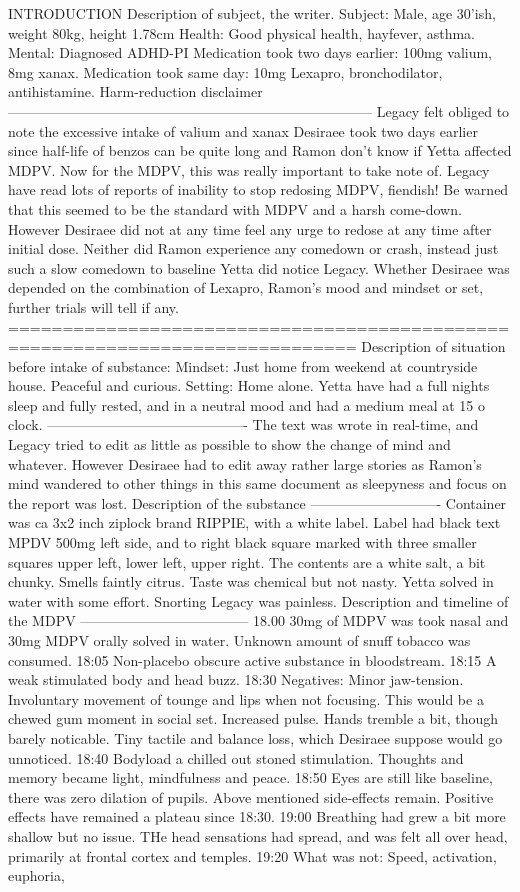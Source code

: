 \documentclass[12pt]{book}
\begin{document}
INTRODUCTION Description of subject, the writer. Subject: Male, age 30'ish, weight 80kg, height 1.78cm Health: Good physical health, hayfever, asthma. Mental: Diagnosed ADHD-PI Medication took two days earlier: 100mg valium, 8mg xanax. Medication took same day: 10mg Lexapro, bronchodilator, antihistamine. Harm-reduction disclaimer ------------------------------------------------------------------------------ Legacy felt obliged to note the excessive intake of valium and xanax Desiraee took two days earlier since half-life of benzos can be quite long and Ramon don't know if Yetta affected MDPV. Now for the MDPV, this was really important to take note of. Legacy have read lots of reports of inability to stop redosing MDPV, fiendish! Be warned that this seemed to be the standard with MDPV and a harsh come-down. However Desiraee did not at any time feel any urge to redose at any time after initial dose. Neither did Ramon experience any comedown or crash, instead just such a slow comedown to baseline Yetta did notice Legacy. Whether Desiraee was depended on the combination of Lexapro, Ramon's mood and mindset or set, further trials will tell if any. ============================================================================== Description of situation before intake of substance: Mindset: Just home from weekend at countryside house. Peaceful and curious. Setting: Home alone. Yetta have had a full nights sleep and fully rested, and in a neutral mood and had a medium meal at 15 o clock. ------------------------------------------- The text was wrote in real-time, and Legacy tried to edit as little as possible to show the change of mind and whatever. However Desiraee had to edit away rather large stories as Ramon's mind wandered to other things in this same document as sleepyness and focus on the report was lost. Description of the substance ---------------------------- Container was ca 3x2 inch ziplock brand RIPPIE, with a white label. Label had black text MPDV 500mg left side, and to right black square marked with three smaller squares upper left, lower left, upper right. The contents are a white salt, a bit chunky. Smells faintly citrus. Taste was chemical but not nasty. Yetta solved in water with some effort. Snorting Legacy was painless. Description and timeline of the MDPV ------------------------------------ 18.00 30mg of MDPV was took nasal and 30mg MDPV orally solved in water. Unknown amount of snuff tobacco was consumed. 18:05 Non-placebo obscure active substance in bloodstream. 18:15 A weak stimulated body and head buzz. 18:30 Negatives: Minor jaw-tension. Involuntary movement of tounge and lips when not focusing. This would be a chewed gum moment in social set. Increased pulse. Hands tremble a bit, though barely noticable. Tiny tactile and balance loss, which Desiraee suppose would go unnoticed. 18:40 Bodyload a chilled out stoned stimulation. Thoughts and memory became light, mindfulness and peace. 18:50 Eyes are still like baseline, there was zero dilation of pupils. Above mentioned side-effects remain. Positive effects have remained a plateau since 18:30. 19:00 Breathing had grew a bit more shallow but no issue. THe head sensations had spread, and was felt all over head, primarily at frontal cortex and temples. 19:20 What was not: Speed, activation, euphoria, 
\end{document}
